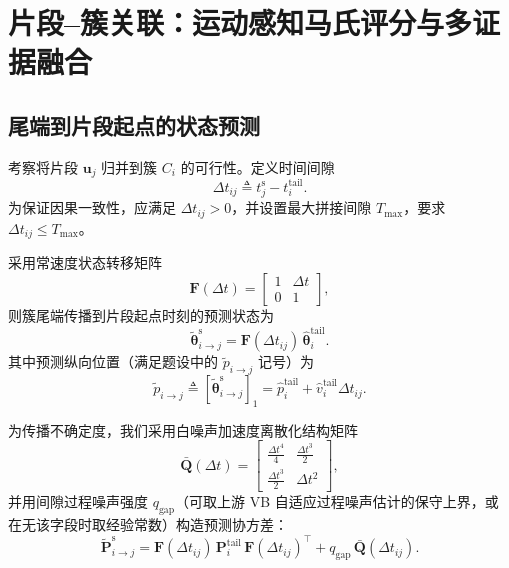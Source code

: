 \documentclass{xdupgthesis}
\begin{document}
\section{片段--簇关联：运动感知马氏评分与多证据融合}
\subsection{尾端到片段起点的状态预测}
考察将片段 $\mathbf{u}_j$ 归并到簇 $C_i$ 的可行性。定义时间间隙
\begin{equation}
	\Delta t_{ij} \triangleq t_j^{\mathrm{s}} - t_i^{\mathrm{tail}}.
	\tag{4-6}
\end{equation}
为保证因果一致性，应满足 $\Delta t_{ij}>0$，并设置最大拼接间隙 $T_{\max}$，要求 $\Delta t_{ij}\le T_{\max}$。

采用常速度状态转移矩阵
\begin{equation}
	\mathbf{F}(\Delta t)=
	\begin{bmatrix}
		1 & \Delta t\\
		0 & 1
	\end{bmatrix},
	\tag{4-7}
\end{equation}
则簇尾端传播到片段起点时刻的预测状态为
\begin{equation}
	\tilde{\boldsymbol{\theta}}_{i\rightarrow j}^{\mathrm{s}}
	=
	\mathbf{F}(\Delta t_{ij})\,\hat{\boldsymbol{\theta}}_i^{\mathrm{tail}}.
	\tag{4-8}
\end{equation}
其中预测纵向位置（满足题设中的 $\tilde p_{i\rightarrow j}$ 记号）为
\begin{equation}
	\tilde p_{i\rightarrow j}
	\triangleq
	\left[\tilde{\boldsymbol{\theta}}_{i\rightarrow j}^{\mathrm{s}}\right]_1
	=
	\hat p_i^{\mathrm{tail}}+\hat v_i^{\mathrm{tail}}\Delta t_{ij}.
	\tag{4-9}
\end{equation}

为传播不确定度，我们采用白噪声加速度离散化结构矩阵
\begin{equation}
	\bar{\mathbf{Q}}(\Delta t)=
	\begin{bmatrix}
		\frac{\Delta t^4}{4} & \frac{\Delta t^3}{2}\\[4pt]
		\frac{\Delta t^3}{2} & \Delta t^2
	\end{bmatrix},
	\tag{4-10}
\end{equation}
并用间隙过程噪声强度 $q_{\mathrm{gap}}$（可取上游 VB 自适应过程噪声估计的保守上界，或在无该字段时取经验常数）构造预测协方差：
\begin{equation}
	\tilde{\mathbf{P}}_{i\rightarrow j}^{\mathrm{s}}
	=
	\mathbf{F}(\Delta t_{ij})\,\mathbf{P}_i^{\mathrm{tail}}\,\mathbf{F}(\Delta t_{ij})^\top
	+
	q_{\mathrm{gap}}\,\bar{\mathbf{Q}}(\Delta t_{ij}).
	\tag{4-11}
\end{equation}
\end{document}
